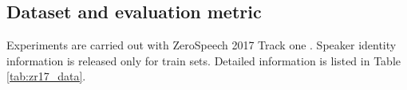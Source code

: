\documentclass[a4paper]{article}
\begin{document}
\subsection{Dataset and evaluation metric}
Experiments are carried out with ZeroSpeech 2017 Track one \cite{dunbar2017zero}.
Speaker identity information is released only for train sets. 
Detailed information  is listed in Table \ref{tab:zr17_data}.

\begin{table}[htbp]
\renewcommand\arraystretch{0.60}
\centering
\caption{Development data in ZeroSpeech 2017 Track one}
\label{tab:zr17_data}
\end{table}
\end{document}
